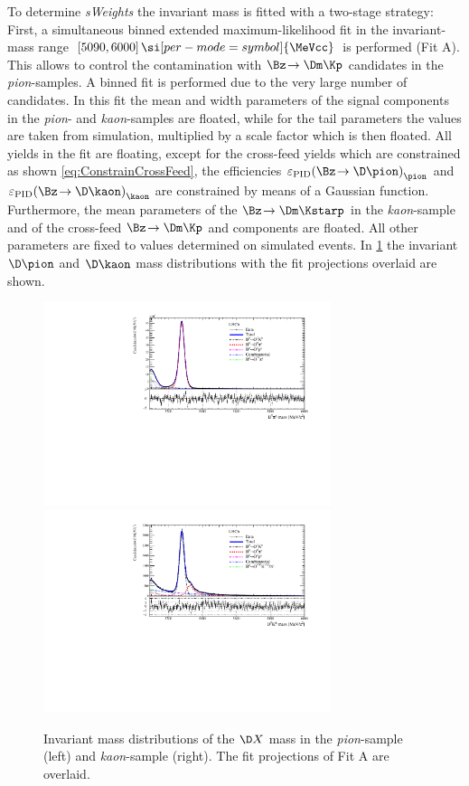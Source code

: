 To determine \emph{sWeights} the invariant \Bz mass is fitted with a two-stage strategy:
First, a simultaneous binned extended maximum-likelihood fit in the invariant-mass range $[5090, 6000]\,\si[per-mode=symbol]{\MeVcc}$ is performed (Fit A).
This allows to control the contamination with $\Bz\!\to\Dm\Kp$ candidates in the \emph{pion}-samples.
A binned fit is performed due to the very large number of candidates.
In this fit the mean and width parameters of the signal components in the \emph{pion}- and \emph{kaon}-samples are floated, while for the tail parameters the values are taken from simulation, multiplied by a scale factor which is then floated.
All yields in the fit are floating, except for the cross-feed yields which are constrained as shown \cref{eq:ConstrainCrossFeed}, \ie the efficiencies $\varepsilon_{\text{PID}}\!\left(\Bz\!\to\D \pion\right)_{\pion}$ and $\varepsilon_{\text{PID}}\!\left(\Bz\!\to\D \kaon\right)_{\kaon}$ are constrained by means of a Gaussian function.
Furthermore, the mean parameters of the $\Bz\!\to\Dm\Kstarp$ in the \emph{kaon}-sample and of the cross-feed $\Bz\!\to\Dm\Kp$ and \BdToDpi components are floated.
All other parameters are fixed to values determined on simulated events.
In \cref{fig:MassFitPlot} the invariant $\D\pion$  and $\D\kaon$ mass distributions with the fit projections overlaid are shown.
\begin{figure}[tbp]
    \centering
    \includegraphics[width=0.75\textwidth]{07MassFit/figs/MDFit_BeautyMass_Bd2DPi_withPulls.pdf}
    \includegraphics[width=0.75\textwidth]{07MassFit/figs/MDFit_BeautyMass_Bd2DK_withPulls.pdf}
    \caption{Invariant mass distributions of the $\D X$ mass in the \emph{pion}-sample (left) and \emph{kaon}-sample (right).
    The fit projections of Fit A are overlaid.}
    \label{fig:MassFitPlot}
\end{figure}

